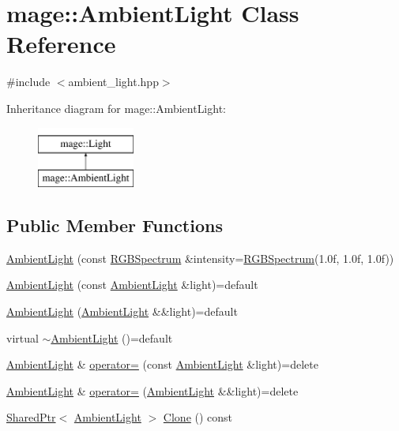 \hypertarget{classmage_1_1_ambient_light}{}\section{mage\+:\+:Ambient\+Light Class Reference}
\label{classmage_1_1_ambient_light}


{\ttfamily \#include $<$ambient\+\_\+light.\+hpp$>$}

Inheritance diagram for mage\+:\+:Ambient\+Light\+:\begin{figure}[H]
\begin{center}
\leavevmode
\includegraphics[height=2.000000cm]{classmage_1_1_ambient_light}
\end{center}
\end{figure}
\subsection*{Public Member Functions}
\begin{DoxyCompactItemize}
\item 
\hyperlink{classmage_1_1_ambient_light_a4ae1590d03ca4e9d854bb6ef650ee126}{Ambient\+Light} (const \hyperlink{structmage_1_1_r_g_b_spectrum}{R\+G\+B\+Spectrum} \&intensity=\hyperlink{structmage_1_1_r_g_b_spectrum}{R\+G\+B\+Spectrum}(1.\+0f, 1.\+0f, 1.\+0f))
\item 
\hyperlink{classmage_1_1_ambient_light_a98103c5883ae43173bcf3afb522cf0a5}{Ambient\+Light} (const \hyperlink{classmage_1_1_ambient_light}{Ambient\+Light} \&light)=default
\item 
\hyperlink{classmage_1_1_ambient_light_a17787dd0d4df87a85c903503b594e51c}{Ambient\+Light} (\hyperlink{classmage_1_1_ambient_light}{Ambient\+Light} \&\&light)=default
\item 
virtual \hyperlink{classmage_1_1_ambient_light_aa1c8811eaff210760c8d5563a3669bd0}{$\sim$\+Ambient\+Light} ()=default
\item 
\hyperlink{classmage_1_1_ambient_light}{Ambient\+Light} \& \hyperlink{classmage_1_1_ambient_light_a9f7eb6bf5d67d4e38fd59ed24837ce4d}{operator=} (const \hyperlink{classmage_1_1_ambient_light}{Ambient\+Light} \&light)=delete
\item 
\hyperlink{classmage_1_1_ambient_light}{Ambient\+Light} \& \hyperlink{classmage_1_1_ambient_light_a5afea0b13343c62e9e2c099d444d0dd2}{operator=} (\hyperlink{classmage_1_1_ambient_light}{Ambient\+Light} \&\&light)=delete
\item 
\hyperlink{namespacemage_a1e01ae66713838a7a67d30e44c67703e}{Shared\+Ptr}$<$ \hyperlink{classmage_1_1_ambient_light}{Ambient\+Light} $>$ \hyperlink{classmage_1_1_ambient_light_aeab3d0316851c0267e92e7e504cff888}{Clone} () const
\end{DoxyCompactItemize}
